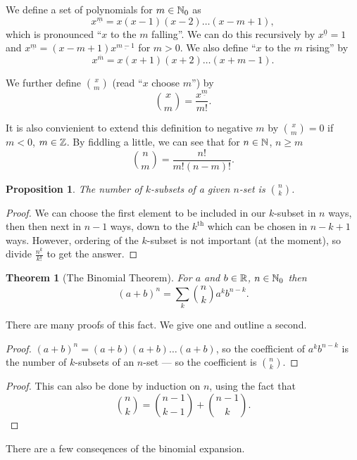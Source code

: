 \documentclass{notes}
\theoremstyle{plain}
\newtheorem{theorem}{Theorem}[chapter]
\newtheorem*{proposition}{Proposition}
\begin{document}
We define a set of polynomials for $m \in \mathbb{N}_0$ as
\[
x^{\underline{m}} = x (x-1) (x-2) \dots (x-m+1),
\]
which is pronounced ``$x$ to the $m$ falling''. We can do this recursively
by $x^{\underline{0}} = 1$ and $x^{\underline{m}} = (x - m + 1)
x^{\underline{m-1}}$ for $m > 0$.  We also define ``$x$ to the $m$ rising''
by
\[
x^{\overline{m}} = x (x+1) (x+2) \dots (x+m-1).
\]

We further define $\binom{x}{m}$ (read ``$x$ choose $m$'') by
\[
\binom{x}{m} = \frac{x^{\underline{m}}}{m!}.
\]

It is also convienient to extend this definition to negative $m$ by
$\binom{x}{m} = 0$ if $m < 0$, $m \in \mathbb{Z}$.  By fiddling a little, we
can see that for $n \in \mathbb{N}$, $n \ge m$
\[
\binom{n}{m} = \frac{n!}{m! (n-m)!}.
\]

\begin{proposition}
The number of $k$-subsets of a given $n$-set is $\binom{n}{k}$.
\end{proposition}

\begin{proof}
We can choose the first element to be included in our $k$-subset in $n$ ways,
then then next in $n-1$ ways, down to the $k^{\text{th}}$ which can be
chosen in $n-k + 1$ ways.  However, ordering of the $k$-subset is not
important (at the moment), so divide $\frac{n^{\underline{k}}}{k!}$ to get
the answer.
\end{proof}

\begin{theorem}[The Binomial Theorem]
For $a$ and $b \in \mathbb{R}$, $n \in \mathbb{N}_0$ then
\[
\left( a + b \right)^n = \sum_k \binom{n}{k} a^k b^{n-k}.
\]
\end{theorem}

There are many proofs of this fact.  We give one and outline a second.

\begin{proof}
$(a+b)^n = (a+b) (a+b) \dots (a+b)$, so the coefficient of $a^k b^{n-k}$
is the number of $k$-subsets of an $n$-set --- so the coefficient is
$\binom{n}{k}$.
\end{proof}

\begin{proof}
This can also be done by induction on $n$, using the fact that
\[
\binom{n}{k} = \binom{n-1}{k-1} + \binom{n-1}{k}.
\]
\end{proof}

There are a few conseqences of the binomial expansion.
\end{document}
